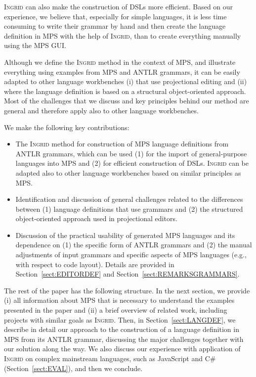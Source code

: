 \textsc{Ingrid} can also make the construction of DSLs more efficient.
Based on our experience, we believe that, especially for simple languages, it is less time consuming to write their grammar by hand and then create the language definition in MPS with the help of \textsc{Ingrid}, than to create everything manually using the MPS GUI.


Although we define the \textsc{Ingrid} method in the context of MPS, and illustrate everything using examples from MPS and ANTLR grammars, it can be easily adapted to other language workbenches (i) that use projectional editing and (ii) where the language definition is based on a structural object-oriented approach.
Most of the challenges that we discuss and key principles behind our method are general and therefore apply also to other language workbenches.

We make the following key contributions:
\begin{itemize}
	\item The \textsc{Ingrid} method for construction of MPS language definitions from ANTLR grammars, which can be used (1) for the import of general-purpose languages into MPS and (2) for efficient construction of DSLs. \textsc{Ingrid} can be adapted also to other language workbenches based on similar principles as MPS.
	\item Identification and discussion of general challenges related to the differences between (1) language definitions that use grammars and (2) the structured object-oriented approach used in projectional editors.
	\item Discussion of the practical usability of generated MPS languages and its dependence on (1) the specific form of ANTLR grammars and (2) the manual adjustments of input grammars and specific aspects of MPS languages (e.g., with respect to code layout). Details are provided in Section~\ref{sect:EDITORDEF} and Section~\ref{sect:REMARKSGRAMMARS}.
\end{itemize}

The rest of the paper has the following structure.
In the next section, we provide (i) all information about MPS that is necessary to understand the examples presented in the paper and (ii) a brief overview of related work, including projects with similar goals as \textsc{Ingrid}.
Then, in Section~\ref{sect:LANGDEF}, we describe in detail our approach to the construction of a language definition in MPS from its ANTLR grammar, discussing the major challenges together with our solution along the way.
We also discuss our experience with application of \textsc{Ingrid} on complex mainstream languages, such as JavaScript and C\# (Section~\ref{sect:EVAL}), and then we conclude.

